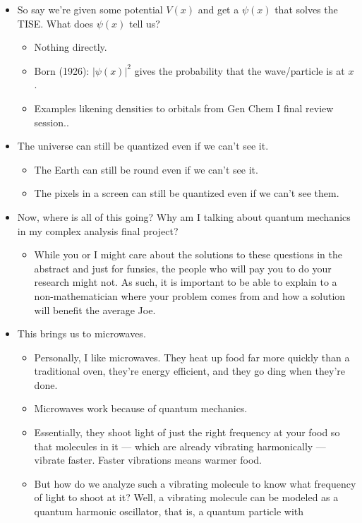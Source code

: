 \documentclass[../finalProject.tex]{subfiles}
\begin{document}
\begin{itemize}
\begin{itemize}
\begin{itemize}
        \end{itemize}
        \item So say we're given some potential $V(x)$ and get a $\psi(x)$ that solves the TISE. What does $\psi(x)$ tell us?
        \begin{itemize}
            \item Nothing directly.
            \item Born (1926): $|\psi(x)|^2$ gives the probability that the wave/particle is at $x$.
            \item Examples likening densities to orbitals from Gen Chem I final review session..
        \end{itemize}
        \item The universe can still be quantized even if we can't see it.
        \begin{itemize}
            \item The Earth can still be round even if we can't see it.
            \item The pixels in a screen can still be quantized even if we can't see them.
        \end{itemize}
        \item Now, where is all of this going? Why am I talking about quantum mechanics in my complex analysis final project?
        \begin{itemize}
            \item While you or I might care about the solutions to these questions in the abstract and just for funsies, the people who will pay you to do your research might not. As such, it is important to be able to explain to a non-mathematician where your problem comes from and how a solution will benefit the average Joe.
        \end{itemize}
        \item This brings us to microwaves.
        \begin{itemize}
            \item Personally, I like microwaves. They heat up food far more quickly than a traditional oven, they're energy efficient, and they go ding when they're done.
            \item Microwaves work because of quantum mechanics.
            \item Essentially, they shoot light of just the right frequency at your food so that molecules in it --- which are already vibrating harmonically --- vibrate faster. Faster vibrations means warmer food.
            \item But how do we analyze such a vibrating molecule to know what frequency of light to shoot at it? Well, a vibrating molecule can be modeled as a quantum harmonic oscillator, that is, a quantum particle with

\end{itemize}
\end{itemize}
\end{itemize}
\end{document}
